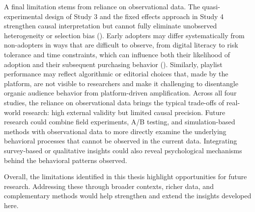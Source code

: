 A final limitation stems from reliance on observational data. The quasi-experimental design of Study 3 and the fixed effects approach in Study 4 strengthen causal interpretation but cannot fully eliminate unobserved heterogeneity or selection bias (\cite{Goldfarb2022-jt}). Early adopters may differ systematically from non-adopters in ways that are difficult to observe, from digital literacy to risk tolerance and time constraints, which can influence both their likelihood of adoption and their subsequent purchasing behavior (\cite{Avery2012-ex,Li2015-tq,Rietveld2018-ay}). Similarly, playlist performance may reflect algorithmic or editorial choices that, made by the platform, are not visible to researchers and make it challenging to disentangle organic audience behavior from platform-driven amplification. Across all four studies, the reliance on observational data brings the typical trade-offs of real-world research: high external validity but limited causal precision. Future research could combine field experiments, A/B testing, and simulation-based methods with observational data to more directly examine the underlying behavioral processes that cannot be observed in the current data. Integrating survey-based or qualitative insights could also reveal psychological mechanisms behind the behavioral patterns observed.

Overall, the limitations identified in this thesis highlight opportunities for future research. Addressing these through broader contexts, richer data, and complementary methods would help strengthen and extend the insights developed here.
